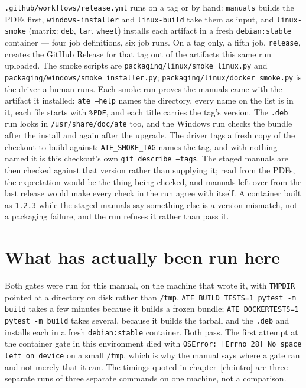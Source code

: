 \texttt{.github/\allowbreak{}workflows/\allowbreak{}release.yml} runs on a tag or by hand: \texttt{manuals} builds the PDFs
first, \texttt{windows-installer} and \texttt{linux-build} take them as input, and \texttt{linux-smoke}
(matrix: \texttt{deb}, \texttt{tar}, \texttt{wheel}) installs each artifact in a fresh \texttt{debian:stable}
container --- four job definitions, six job runs. On a tag only, a fifth job, \texttt{release}, creates
the GitHub Release for that tag out of the artifacts this same run uploaded. The smoke scripts are
\texttt{packaging/\allowbreak{}linux/\allowbreak{}smoke\_\allowbreak{}linux.py} and
\texttt{packaging/\allowbreak{}windows/\allowbreak{}smoke\_\allowbreak{}installer.py};
\texttt{packaging/\allowbreak{}linux/\allowbreak{}docker\_\allowbreak{}smoke.py} is the driver a human runs.
Each smoke run proves the manuals came with the artifact it installed: \texttt{ate --help} names the
directory, every name on the list is in it, each file starts with \texttt{\%PDF}, and each title carries
the tag's version. The \texttt{.deb} run looks in \texttt{/usr/share/\allowbreak{}doc/ate} too, and the
Windows run checks the bundle after the install and again after the upgrade.
The driver tags a fresh copy of the checkout to build against: \texttt{ATE\_\allowbreak{}SMOKE\_\allowbreak{}TAG}
names the tag, and with nothing named it is this checkout's own \texttt{git describe --tags}. The
staged manuals are then checked against that version rather than supplying it; read from the PDFs,
the expectation would be the thing being checked, and manuals left over from the last release would
make every check in the run agree with itself. A container built as \texttt{1.2.3} while the staged
manuals say something else is a version mismatch, not a packaging failure, and the run refuses it
rather than pass it.

\section{What has actually been run here}

Both gates were run for this manual, on the machine that wrote it, with \texttt{TMPDIR} pointed at a
directory on disk rather than \texttt{/tmp}. \texttt{ATE\_\allowbreak{}BUILD\_\allowbreak{}TESTS=1 pytest -m build} takes a few minutes
because it builds a frozen bundle; \texttt{ATE\_\allowbreak{}DOCKER\allowbreak{}TESTS=1 pytest -m build} takes several, because it builds the tarball
and the \texttt{.deb} and installs each in a fresh \texttt{debian:stable} container. Both pass. The first
attempt at the container gate in this environment died with \texttt{OSError: [Errno 28] No space left on
device} on a small \texttt{/tmp}, which is why the manual says where a gate ran and not merely that it
can. The timings quoted in chapter~\ref{ch:intro} are three separate runs of three
separate commands on one machine, not a comparison.

